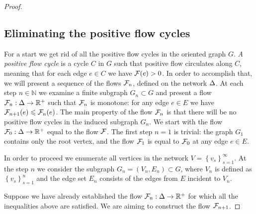 \documentclass[12pt,oneside,a4paper]{amsart}
\begin{document}
\begin{proof}
      \medskip
      \subsection{Eliminating the positive flow cycles}
        For a start we get rid of all the positive flow cycles in the oriented graph $G$.
        \emph{A positive flow cycle} is a cycle $C$ in $G$ such that positive flow circulates along $C$,
          meaning that for each edge $e \in C$ we have $\mathcal{F}(e) > 0$.
        In order to accomplish that, we will present a sequence of the flows $\mathcal{F}_{n}$, defined on the network $\Delta$.
        At each step $n \in \mathbb{N}$ we examine a finite subgraph $G_n \subset G$ and present a flow $\mathcal{F}_{n}: \Delta \to \mathbb{R}^{+}$
          such that $\mathcal{F}_{n}$ is monotone: for any edge $e \in E$ we have $\mathcal{F}_{n+1}(e) \leqslant \mathcal{F}_{n}(e)$.
        The main property of the flow $\mathcal{F}_{n}$ is that there will be no positive flow cycles in the induced subgraph
        $G_n$.
        We start with the flow $\mathcal{F}_{0}:\Delta \to \mathbb{R}^+$ equal to the flow $\mathcal{F}$.
        The first step $n = 1$ is trivial: the graph $G_1$ contains only the root vertex, and
          the flow $\mathcal{F}_{1}$ is equal to $\mathcal{F}_{0}$ at any edge $e \in E$.

        In order to proceed we enumerate all vertices in the network $V = \left\{v_s\right\}_{s=1}^\infty$.
        At the step $n$ we consider the subgraph $G_n = (V_n, E_n) \subset G$, where $V_n$ is defined as $\left\{v_s\right\}_{s=1}^n$
          and the edge set $E_n$ consists of the edges from $E$ incident to $V_n$.

        Suppose we have already established the flow $\mathcal{F}_{n}: \Delta \to \mathbb{R}^{+}$ for which
          all the inequalities above are satisfied.
        We are aiming to construct the flow $\mathcal{F}_{n+1}$.


\end{proof}
\end{document}
